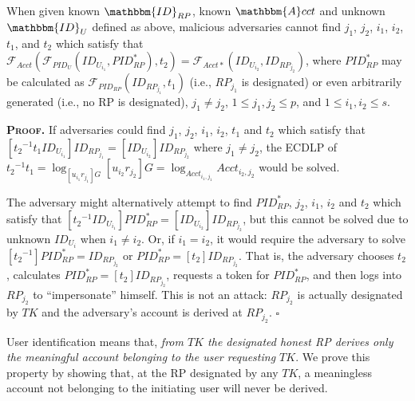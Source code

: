 \vspace{1.5mm}
\begin{thm}[RP Designation]
When given known $\mathbbm{ID}_{RP}$, known $\mathbbm{A}cct$ and unknown $\mathbbm{ID}_U$ defined as above,
  malicious adversaries cannot find ${j_1}$, ${j_2}$, ${i_1}$, ${i_2}$, $t_1$, and $t_2$ which satisfy that $\mathcal{F}_{Acct}(\mathcal{F}_{PID_U}(ID_{U_{i_1}}, PID_{RP}^{*}), t_2) = \mathcal{F}_{Acct\ast}(ID_{U_{i_2}}, ID_{RP_{j_2}})$,
where $PID_{RP}^{*}$ may be calculated as $\mathcal{F}_{PID_{RP}}(ID_{RP_{j_1}}, t_1)$
    (i.e., $RP_{j_1}$ is designated)
    or even arbitrarily generated (i.e., no RP is designated),
    ${j_1} \neq {j_2}$, $1 \leq j_1, j_2 \leq p$, and $1 \leq i_1, i_2 \leq s$.
\label{thm-rp-designation}
\end{thm}

\noindent\textbf{\textsc{Proof.}} 
If adversaries could find ${j_1}$, ${j_2}$, ${i_1}$, ${i_2}$, $t_1$ and $t_2$ which satisfy that $[{t_2}^{-1}t_1ID_{U_{i_1}}]ID_{RP_{j_1}} = [ID_{U_{i_2}}]ID_{RP_{j_2}}$
 where ${j_1} \neq {j_2}$,
 the ECDLP of ${t_2}^{-1}t_1 = \log_{[{u_{i_1}}{r_{j_1}}]G}{[{u_{i_2}}{r_{j_2}}]G}
 = \log_{Acct_{i_1,j_1}}{Acct_{i_2,j_2}}$ would be solved.

The adversary might alternatively attempt to find $PID_{RP}^{*}$, ${j_2}$, ${i_1}$, ${i_2}$ and $t_2$ which satisfy that $[{{t_2}^{-1}}ID_{U_{i_1}}]PID_{RP}^{*} = [ID_{U_{i_2}}]ID_{RP_{j_2}}$,
        but this cannot be solved due to unknown $ID_{U_{i}}$ when ${i_1} \neq {i_2}$.
Or, if ${i_1} = {i_2}$, 
    it would require the adversary to solve $[{{t_2}^{-1}}]PID_{RP}^{*} = ID_{RP_{j_2}}$
        or $PID_{RP}^{*} = [t_2]ID_{RP_{j_2}}$.
That is,
    the adversary chooses $t_2$, calculates $PID_{RP}^{*} = [t_2]ID_{RP_{j_2}}$, requests a token for $PID_{RP}^{*}$, and then logs into $RP_{j_2}$ to ``impersonate'' himself.
This is not an attack: $RP_{j_2}$ is actually designated by $TK$ and the adversary's account is derived at $RP_{j_2}$.
\hfill $\square$

\vspace{1.5mm}

User identification means that,
\emph{from $TK$ the designated honest RP derives only the meaningful account belonging to the user requesting $TK$}.
We prove this property by showing that,
    at the RP designated by any $TK$,
        a meaningless account not belonging to the initiating user will never be derived.

